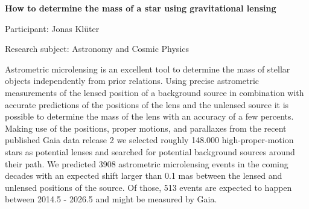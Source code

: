 \hfill 


\begin{minipage}[t]{1.0\textwidth}

\begin{center}

{{\large\bfseries How to determine the mass of a star using gravitational lensing}\par}

\end{center}

{\noindent Participant: Jonas Klüter\par} 

{\noindent Research subject: Astronomy and Cosmic Physics\par}\medskip

\noindent  Astrometric microlensing is an excellent tool to determine the mass of stellar objects independently from prior relations. Using precise astrometric measurements of the lensed position of a background source in combination with accurate predictions of the positions of the lens and the unlensed source it is possible to determine the mass of the lens with an accuracy of a few percents. Making use of the positions, proper motions, and parallaxes from the recent published  Gaia data release 2 we selected roughly 148.000 high-proper-motion stars as potential lenses and searched for potential background sources around their path.  We predicted 3908 astrometric microlensing events in the coming decades with an expected shift larger than 0.1 mas between the lensed and unlensed positions of the source. Of those, 513 events are expected to happen between 2014.5 - 2026.5 and might be measured by Gaia. 
\par\end{minipage}

\hfill 

